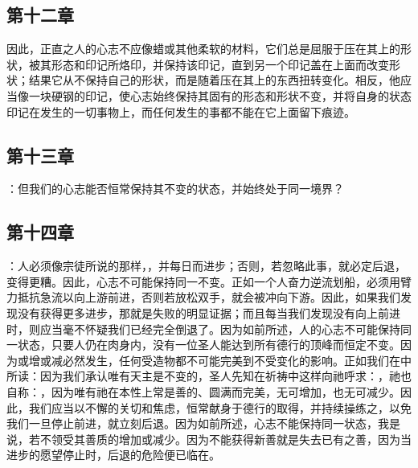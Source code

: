
\subsection{第十二章}

\par

因此，正直之人的心志不应像蜡或其他柔软的材料，它们总是屈服于压在其上的形状，被其形态和印记所烙印，并保持该印记，直到另一个印记盖在上面而改变形状；结果它从不保持自己的形状，而是随着压在其上的东西扭转变化。相反，他应当像一块硬钢的印记，使心志始终保持其固有的形态和形状不变，并将自身的状态印记在发生的一切事物上，而任何发生的事都不能在它上面留下痕迹。\par


\subsection{第十三章}

\par

：但我们的心志能否恒常保持其不变的状态，并始终处于同一境界？\par


\subsection{第十四章}

\par

：人必须像宗徒所说的那样，，并每日而进步；否则，若忽略此事，就必定后退，变得更糟。因此，心志不可能保持同一不变。正如一个人奋力逆流划船，必须用臂力抵抗急流以向上游前进，否则若放松双手，就会被冲向下游。因此，如果我们发现没有获得更多进步，那就是失败的明显证据；而且每当我们发现没有向上前进时，则应当毫不怀疑我们已经完全倒退了。因为如前所述，人的心志不可能保持同一状态，只要人仍在肉身内，没有一位圣人能达到所有德行的顶峰而恒定不变。因为或增或减必然发生，任何受造物都不可能完美到不受变化的影响。正如我们在中所读：因为我们承认唯有天主是不变的，圣人先知在祈祷中这样向祂呼求：，祂也自称：，因为唯有祂在本性上常是善的、圆满而完美，无可增加，也无可减少。因此，我们应当以不懈的关切和焦虑，恒常献身于德行的取得，并持续操练之，以免我们一旦停止前进，就立刻后退。因为如前所述，心志不能保持同一状态，我是说，若不领受其善质的增加或减少。因为不能获得新善就是失去已有之善，因为当进步的愿望停止时，后退的危险便已临在。\par

